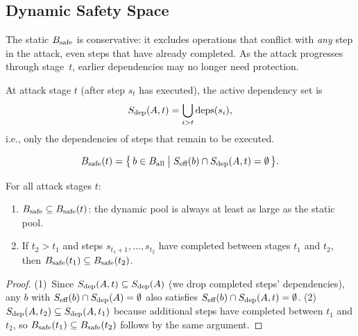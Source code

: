 \subsection{Dynamic Safety Space}
\label{sec:dynamic}

The static $B_{\text{safe}}$ is conservative: it excludes operations that conflict
with \emph{any} step in the attack, even steps that have already
completed. As the attack progresses through stage~$t$, earlier
dependencies may no longer need protection.

\begin{definition}
\label{def:active_deps}
At attack stage $t$ (after step $s_t$ has executed), the active
dependency set is
\begin{equation}
  S_{\text{dep}}(A, t) = \bigcup_{i > t} \mathrm{deps}(s_i),
  \label{eq:sdep_t}
\end{equation}
i.e., only the dependencies of steps that remain to be executed.
\end{definition}

\begin{definition}
\label{def:dynamic_safe_pool}
\begin{equation}
  B_{\text{safe}}(t) = \bigl\{\, b \in B_{\text{all}} \;\big|\;
               S_{\text{eff}}(b) \cap S_{\text{dep}}(A, t) = \emptyset \,\bigr\}.
  \label{eq:bsafe_t}
\end{equation}
\end{definition}

\begin{theorem}
\label{thm:dynamic}
For all attack stages $t$:
\begin{enumerate}
  \item $B_{\text{safe}} \subseteq B_{\text{safe}}(t)$: the dynamic pool is always at
        least as large as the static pool.
  \item If $t_2 > t_1$ and steps $s_{t_1+1}, \ldots, s_{t_2}$ have
        completed between stages $t_1$ and $t_2$, then
        $B_{\text{safe}}(t_1) \subseteq B_{\text{safe}}(t_2)$.
\end{enumerate}
\end{theorem}

\begin{proof}
(1)~Since $S_{\text{dep}}(A, t) \subseteq S_{\text{dep}}(A)$ (we drop completed steps'
dependencies), any $b$ with $S_{\text{eff}}(b) \cap S_{\text{dep}}(A) = \emptyset$
also satisfies $S_{\text{eff}}(b) \cap S_{\text{dep}}(A, t) = \emptyset$.
(2)~$S_{\text{dep}}(A, t_2) \subseteq S_{\text{dep}}(A, t_1)$ because additional steps
have completed between $t_1$ and $t_2$, so
$B_{\text{safe}}(t_1) \subseteq B_{\text{safe}}(t_2)$ follows by the same argument.
\end{proof}

